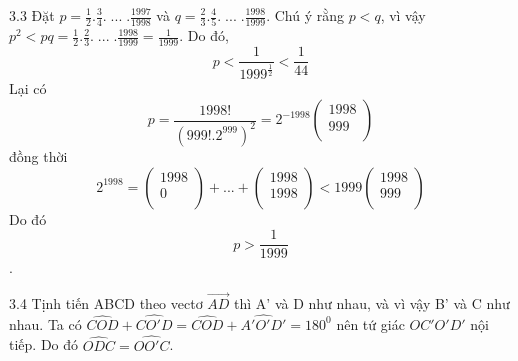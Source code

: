 \begin{Answer}{3.3}
 Đặt $p = \frac{1}{2}.\frac{3}{4}.\;...\;.\frac{{1997}}{{1998}}$ và $q = \frac{2}{3}.\frac{4}{5}.\;...\;.\frac{{1998}}{{1999}}$. Chú ý rằng $p<q$, vì vậy $p^2  < pq = \frac{1}{2}.\frac{2}{3}.\;...\;.\frac{{1998}}{{1999}} = \frac{1}{{1999}}$. Do đó,
\[ p < \frac{1}{{1999^{\frac{1}{2}} }} < \frac{1}{{44}}\]
Lại có \[p = \frac{{1998!}}{{\left( {999!.2^{999} } \right)^2 }} = 2^{ - 1998} \left( \begin{array}{c}
 1998 \\
 999 \\
 \end{array} \right)
\]
đồng thời
\[
2^{1998}  = \left( \begin{array}{c}
 1998 \\
 0 \\
 \end{array} \right) + ... + \left( \begin{array}{l}
 1998 \\
 1998 \\
 \end{array} \right) < 1999\left( \begin{array}{c}
 1998 \\
  999 \\
 \end{array} \right)
\]
Do đó \[p > \frac{1}{{1999}}\].
\end{Answer}
\begin{Answer}{3.4}
 Tịnh tiến ABCD theo vectơ $\overrightarrow {AD} $ thì A' và D như nhau, và vì vậy B' và C như nhau.
Ta có $\widehat{COD} + \widehat{CO'D} = \widehat{COD} + \widehat{A'O'D'} = 180^0 $ nên tứ giác $OC'O'D'$ nội tiếp. Do đó  $\widehat{ODC} = \widehat{OO'C}$.
\end{Answer}

